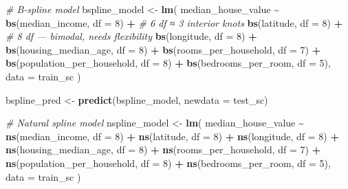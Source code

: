\documentclass[
]{article}
\newenvironment{Shaded}{\begin{snugshade}}{\end{snugshade}}
\newcommand{\AttributeTok}[1]{\textcolor[rgb]{0.13,0.29,0.53}{#1}}
\newcommand{\CommentTok}[1]{\textcolor[rgb]{0.56,0.35,0.01}{\textit{#1}}}
\newcommand{\DecValTok}[1]{\textcolor[rgb]{0.00,0.00,0.81}{#1}}
\newcommand{\FunctionTok}[1]{\textcolor[rgb]{0.13,0.29,0.53}{\textbf{#1}}}
\newcommand{\NormalTok}[1]{#1}
\newcommand{\OtherTok}[1]{\textcolor[rgb]{0.56,0.35,0.01}{#1}}
\newcommand{\SpecialCharTok}[1]{\textcolor[rgb]{0.81,0.36,0.00}{\textbf{#1}}}
\begin{document}
\begin{Shaded}
\begin{Highlighting}[]
\CommentTok{\# B{-}spline model }
\NormalTok{bspline\_model }\OtherTok{\textless{}{-}} \FunctionTok{lm}\NormalTok{(}
\NormalTok{  median\_house\_value }\SpecialCharTok{\textasciitilde{}}
    \FunctionTok{bs}\NormalTok{(median\_income,            }\AttributeTok{df =} \DecValTok{8}\NormalTok{) }\SpecialCharTok{+}   \CommentTok{\# 6 df ≈ 3 interior knots}
    \FunctionTok{bs}\NormalTok{(latitude,                 }\AttributeTok{df =} \DecValTok{8}\NormalTok{) }\SpecialCharTok{+}   \CommentTok{\# 8 df — bimodal, needs flexibility}
    \FunctionTok{bs}\NormalTok{(longitude,                }\AttributeTok{df =} \DecValTok{8}\NormalTok{) }\SpecialCharTok{+}
    \FunctionTok{bs}\NormalTok{(housing\_median\_age,       }\AttributeTok{df =} \DecValTok{8}\NormalTok{) }\SpecialCharTok{+}
    \FunctionTok{bs}\NormalTok{(rooms\_per\_household,      }\AttributeTok{df =} \DecValTok{7}\NormalTok{) }\SpecialCharTok{+}
    \FunctionTok{bs}\NormalTok{(population\_per\_household, }\AttributeTok{df =} \DecValTok{8}\NormalTok{) }\SpecialCharTok{+}
    \FunctionTok{bs}\NormalTok{(bedrooms\_per\_room,        }\AttributeTok{df =} \DecValTok{5}\NormalTok{),}
  \AttributeTok{data =}\NormalTok{ train\_sc}
\NormalTok{)}

\NormalTok{bspline\_pred }\OtherTok{\textless{}{-}} \FunctionTok{predict}\NormalTok{(bspline\_model, }\AttributeTok{newdata =}\NormalTok{ test\_sc)}

\CommentTok{\# Natural spline model }
\NormalTok{nspline\_model }\OtherTok{\textless{}{-}} \FunctionTok{lm}\NormalTok{(}
\NormalTok{  median\_house\_value }\SpecialCharTok{\textasciitilde{}}
    \FunctionTok{ns}\NormalTok{(median\_income,            }\AttributeTok{df =} \DecValTok{8}\NormalTok{) }\SpecialCharTok{+}
    \FunctionTok{ns}\NormalTok{(latitude,                 }\AttributeTok{df =} \DecValTok{8}\NormalTok{) }\SpecialCharTok{+}
    \FunctionTok{ns}\NormalTok{(longitude,                }\AttributeTok{df =} \DecValTok{8}\NormalTok{) }\SpecialCharTok{+}
    \FunctionTok{ns}\NormalTok{(housing\_median\_age,       }\AttributeTok{df =} \DecValTok{8}\NormalTok{) }\SpecialCharTok{+}
    \FunctionTok{ns}\NormalTok{(rooms\_per\_household,      }\AttributeTok{df =} \DecValTok{7}\NormalTok{) }\SpecialCharTok{+}
    \FunctionTok{ns}\NormalTok{(population\_per\_household, }\AttributeTok{df =} \DecValTok{8}\NormalTok{) }\SpecialCharTok{+}
    \FunctionTok{ns}\NormalTok{(bedrooms\_per\_room,        }\AttributeTok{df =} \DecValTok{5}\NormalTok{),}
  \AttributeTok{data =}\NormalTok{ train\_sc}
\NormalTok{)}


\end{Highlighting}
\end{Shaded}
\end{document}
